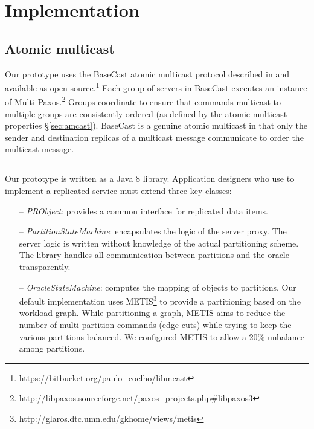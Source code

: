 \section{Implementation}
\label{sec:implementation}

\subsection{Atomic multicast}

Our \dynastar prototype uses the BaseCast atomic multicast protocol described in \cite{Coelho:2017} and available as open source.\footnote{https://bitbucket.org/paulo\_coelho/libmcast}
Each group of servers in BaseCast executes an instance of Multi-Paxos.\footnote{http://libpaxos.sourceforge.net/paxos\_projects.php\#libpaxos3}
Groups coordinate to ensure that commands multicast to multiple groups are consistently ordered (as defined by the atomic multicast properties \S\ref{sec:amcast}).
BaseCast is a genuine atomic multicast in that only the sender and destination replicas of a multicast message communicate to order the multicast message. 

\subsection{\dynastar}

Our  \dynastar prototype is written as a
Java 8 library.
Application designers who use \dynastar
 to implement a replicated service must extend three key classes:
 \begin{itemize}
 \item[--] \emph{PRObject}: provides a common interface for replicated data items.
 \item[--] \emph{PartitionStateMachine}: encapsulates the logic of the server
   proxy. The server logic is written without knowledge of the actual partitioning scheme. The \dynastar library
   handles all communication between partitions and the oracle transparently.
 \item[--] \emph{OracleStateMachine}: computes the mapping of objects to partitions.
Our default implementation uses METIS\footnote{http://glaros.dtc.umn.edu/gkhome/views/metis} to provide a partitioning based on the workload graph.
While partitioning a graph, METIS aims to reduce the number of multi-partition commands (edge-cuts) while trying to keep the various partitions balanced. 
We configured METIS to allow a 20\% unbalance among partitions. 
 \end{itemize}

